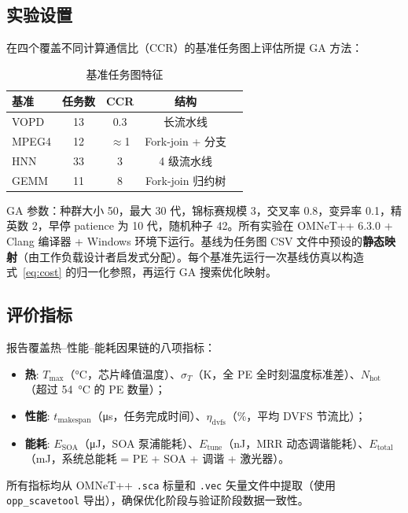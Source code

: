 \documentclass[conference]{IEEEtran}
\begin{document}
\subsection{实验设置}

在四个覆盖不同计算通信比（CCR）的基准任务图上评估所提 GA 方法：

\begin{table}[h]
\centering
\caption{基准任务图特征}
\label{tab:benchmarks}
\begin{tabular}{lcccc}
\toprule
\textbf{基准} & \textbf{任务数} & \textbf{CCR} & \textbf{结构} \\
\midrule
VOPD   & 13 & 0.3  & 长流水线 \\
MPEG4  & 12 & $\approx$1 & Fork-join + 分支 \\
HNN    & 33 & 3    & 4 级流水线 \\
GEMM   & 11 & 8    & Fork-join 归约树 \\
\bottomrule
\end{tabular}
\end{table}

GA 参数：种群大小 50，最大 30 代，锦标赛规模 3，交叉率 0.8，变异率 0.1，精英数 2，早停 patience 为 10 代，随机种子 42。所有实验在 OMNeT++ 6.3.0 + Clang 编译器 + Windows 环境下运行。基线为任务图 CSV 文件中预设的\textbf{静态映射}（由工作负载设计者启发式分配）。每个基准先运行一次基线仿真以构造式~\eqref{eq:cost} 的归一化参照，再运行 GA 搜索优化映射。

\subsection{评价指标}

报告覆盖热--性能--能耗因果链的八项指标：

\begin{itemize}
\item \textbf{热}: $T_{\max}$（\si{\degreeCelsius}，芯片峰值温度）、$\sigma_T$（K，全 PE 全时刻温度标准差）、$N_{\text{hot}}$（超过 \SI{54}{\degreeCelsius} 的 PE 数量）；
\item \textbf{性能}: $t_{\text{makespan}}$（\si{\micro\second}，任务完成时间）、$\eta_{\text{dvfs}}$（\%，平均 DVFS 节流比）；
\item \textbf{能耗}: $E_{\text{SOA}}$（\si{\micro\joule}，SOA 泵浦能耗）、$E_{\text{tune}}$（\si{\nano\joule}，MRR 动态调谐能耗）、$E_{\text{total}}$（\si{\milli\joule}，系统总能耗 = PE + SOA + 调谐 + 激光器）。
\end{itemize}

所有指标均从 OMNeT++ \texttt{.sca} 标量和 \texttt{.vec} 矢量文件中提取（使用 \texttt{opp\_scavetool} 导出），确保优化阶段与验证阶段数据一致性。
\end{document}
